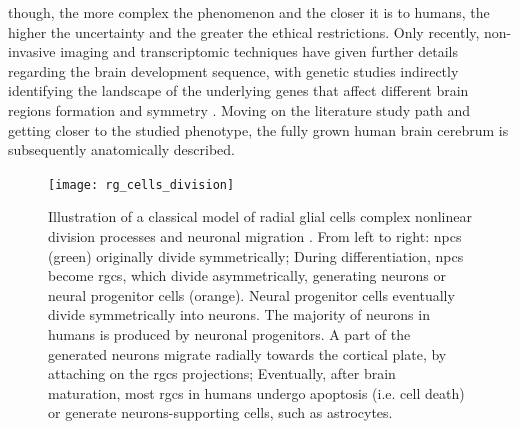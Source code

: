 though, the more complex the phenomenon and the closer it is to humans, the higher the uncertainty and the greater the ethical restrictions. Only recently, non-invasive imaging and transcriptomic techniques have given further details regarding the brain development sequence, with genetic studies indirectly identifying the landscape of the underlying genes that affect different brain regions formation and symmetry \cite{Cara2022}. Moving on the literature study path and getting closer to the studied phenotype, the fully grown human brain cerebrum is subsequently anatomically described.

\begin{figure}
	\centering
	\texttt{[image: rg\_cells\_division]}\\
	\caption[A classical model of radial glial cells division processes \cite{Rakic2009}]{Illustration of a classical model of radial glial cells complex nonlinear division processes and neuronal migration \cite{Rakic2009}. From left to right: \acsp{npc} (green) originally divide symmetrically; During differentiation, \acsp{npc} become \acsp{rgc}, which divide asymmetrically, generating neurons or neural progenitor cells (orange). Neural progenitor cells eventually divide symmetrically into neurons. The majority of neurons in humans is produced by neuronal progenitors. A part of the generated neurons migrate radially towards the cortical plate, by attaching on the \acsp{rgc} projections; Eventually, after brain maturation, most \acsp{rgc} in humans undergo apoptosis (i.e. cell death) or generate neurons-supporting cells, such as astrocytes.}
	\label{fig:rgc}
\end{figure}


